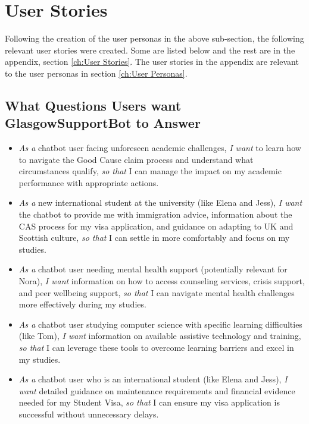 \documentclass{l4proj}
\begin{document}
\section{User Stories}

Following the creation of the user personas in the above sub-section, the following relevant user stories were created. Some are listed below and the rest are in the appendix, section \ref{ch:User Stories}. The user stories in the appendix are relevant to the user personas in section \ref{ch:User Personas}.

\subsection{What Questions Users want GlasgowSupportBot to Answer}
\begin{itemize}
    
    \item \textit{As a} chatbot user facing unforeseen academic challenges, \textit{I want} to learn how to navigate the Good Cause claim process and understand what circumstances qualify, \textit{so that} I can manage the impact on my academic performance with appropriate actions.
    
    \item \textit{As a} new international student at the university (like Elena and Jess), \textit{I want} the chatbot to provide me with immigration advice, information about the CAS process for my visa application, and guidance on adapting to UK and Scottish culture, \textit{so that} I can settle in more comfortably and focus on my studies.
    
    \item \textit{As a} chatbot user needing mental health support (potentially relevant for Nora), \textit{I want} information on how to access counseling services, crisis support, and peer wellbeing support, \textit{so that} I can navigate mental health challenges more effectively during my studies.

    \item \textit{As a} chatbot user studying computer science with specific learning difficulties (like Tom), \textit{I want} information on available assistive technology and training, \textit{so that} I can leverage these tools to overcome learning barriers and excel in my studies.
    
    \item \textit{As a} chatbot user who is an international student (like Elena and Jess), \textit{I want} detailed guidance on maintenance requirements and financial evidence needed for my Student Visa, \textit{so that} I can ensure my visa application is successful without unnecessary delays.
    

\end{itemize}
\end{document}
